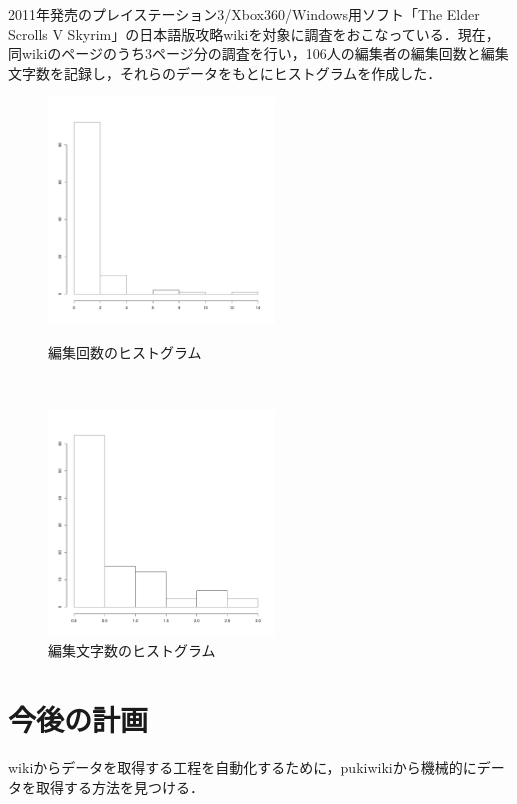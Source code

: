 \documentclass[uplatex,twocolumn,dvipdfmx]{jsarticle}
\begin{document}
2011年発売のプレイステーション3/Xbox360/Windows用ソフト「The Elder Scrolls V Skyrim」の日本語版攻略wiki\cite{wiki}を対象に調査をおこなっている．現在，同wikiのページのうち3ページ分の調査を行い，106人の編集者の編集回数と編集文字数を記録し，それらのデータをもとにヒストグラムを作成した．



\begin{figure}[thbp]
 \begin{minipage}{1\hsize}
  \begin{center}
   \includegraphics[width=60mm]{skyrmK.pdf}
   \caption{編集回数のヒストグラム}
   \label{left}
  \end{center}
 \end{minipage}\\
 \begin{minipage}{1\hsize}
  \begin{center}
   \includegraphics[width=60mm]{skyrmG.pdf}
   \caption{編集文字数のヒストグラム}
   \label{right}
  \end{center}
 \end{minipage}
\end{figure}


\section{今後の計画}

wikiからデータを取得する工程を自動化するために，pukiwikiから機械的にデータを取得する方法を見つける．


\end{document}
